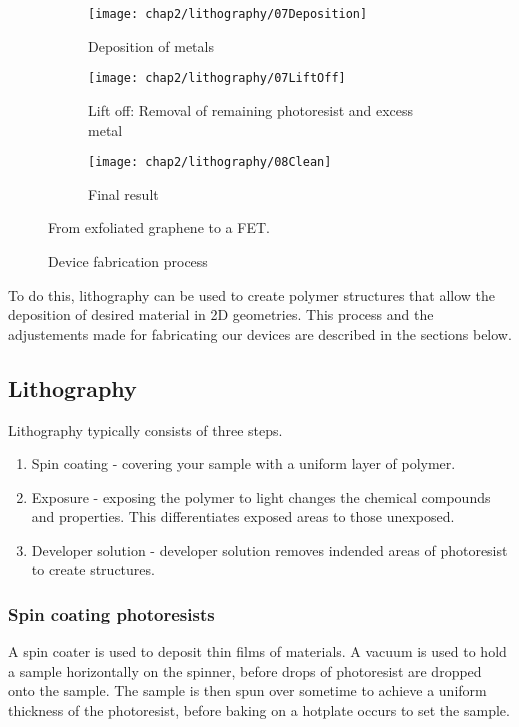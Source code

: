\documentclass[../../Matt_Gebert_Honours_Thesis.tex]{subfiles}
\begin{document}
\begin{figure}[H]
\begin{subfigure}{0.2\textwidth}
		\centering
		\texttt{[image: chap2/lithography/07Deposition]}
		\caption{Deposition of metals}
	\end{subfigure}
	\hspace{0.04\textwidth}
	\begin{subfigure}{0.2\textwidth}
		\centering
		\texttt{[image: chap2/lithography/07LiftOff]}
		\caption{Lift off: Removal of remaining photoresist and excess metal}
	\end{subfigure}
	\hspace{0.04\textwidth}
	\begin{subfigure}{0.2\textwidth}
		\centering
		\texttt{[image: chap2/lithography/08Clean]}
		\caption{Final result}
	\end{subfigure}
	\caption{Device fabrication process}\label{fig:litho}
	From exfoliated graphene to a FET.
	\end{figure}
	
	To do this, lithography can be used to create polymer structures that allow the deposition of desired material in 2D geometries. This process and the adjustements made for fabricating our devices are described in the sections below.
	
	\subsection{Lithography}\label{sec:lithography}
	Lithography typically consists of three steps.
	
	
	\begin{enumerate}
		\item Spin coating - covering your sample with a uniform layer of polymer.
		\item Exposure - exposing the polymer to light changes the chemical compounds and properties. This differentiates exposed areas to those unexposed.
		\item Developer solution - developer solution removes indended areas of photoresist to create structures.
	\end{enumerate}
	
	\subsubsection{Spin coating photoresists}\label{sec:resists}
	A spin coater is used to deposit thin films of materials. A vacuum is used to hold a sample horizontally on the spinner, before drops of photoresist are dropped onto the sample. The sample is then spun over sometime to achieve a uniform thickness of the photoresist, before baking on a hotplate occurs to set the sample.
	
\end{document}
